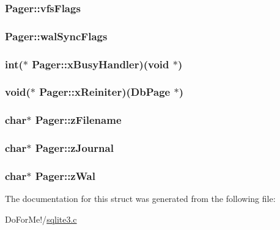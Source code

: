 \hypertarget{struct_pager_a36f3333fe82c70a46a99f2f8f289a971}{
\subsubsection[{vfs\-Flags}]{ Pager\-::vfs\-Flags}}\label{struct_pager_a36f3333fe82c70a46a99f2f8f289a971}
\hypertarget{struct_pager_aa8c8c2d893e4d2165f089ddde3e85103}{
\subsubsection[{wal\-Sync\-Flags}]{ Pager\-::wal\-Sync\-Flags}}\label{struct_pager_aa8c8c2d893e4d2165f089ddde3e85103}
\hypertarget{struct_pager_ac8477f7cc39fefd81b4089994e13d215}{
\subsubsection[{x\-Busy\-Handler}]{\setlength{\rightskip}{0pt plus 5cm}int($\ast$ Pager\-::x\-Busy\-Handler)(void $\ast$)}}\label{struct_pager_ac8477f7cc39fefd81b4089994e13d215}
\hypertarget{struct_pager_a632d3c81743a7f9104337ae3d45af04c}{
\subsubsection[{x\-Reiniter}]{\setlength{\rightskip}{0pt plus 5cm}void($\ast$ Pager\-::x\-Reiniter)({\bf Db\-Page} $\ast$)}}\label{struct_pager_a632d3c81743a7f9104337ae3d45af04c}
\hypertarget{struct_pager_a2a55a044468f8658b7993e57087a5561}{
\subsubsection[{z\-Filename}]{\setlength{\rightskip}{0pt plus 5cm}char$\ast$ Pager\-::z\-Filename}}\label{struct_pager_a2a55a044468f8658b7993e57087a5561}
\hypertarget{struct_pager_ab36ce1f606c407ad3fc56a3651f5a319}{
\subsubsection[{z\-Journal}]{\setlength{\rightskip}{0pt plus 5cm}char$\ast$ Pager\-::z\-Journal}}\label{struct_pager_ab36ce1f606c407ad3fc56a3651f5a319}
\hypertarget{struct_pager_ac63ab281e48f9ac8521b85c1a90475b3}{
\subsubsection[{z\-Wal}]{\setlength{\rightskip}{0pt plus 5cm}char$\ast$ Pager\-::z\-Wal}}\label{struct_pager_ac63ab281e48f9ac8521b85c1a90475b3}


The documentation for this struct was generated from the following file\-:\begin{DoxyCompactItemize}
\item 
Do\-For\-Me!/\hyperlink{sqlite3_8c}{sqlite3.\-c}\end{DoxyCompactItemize}
